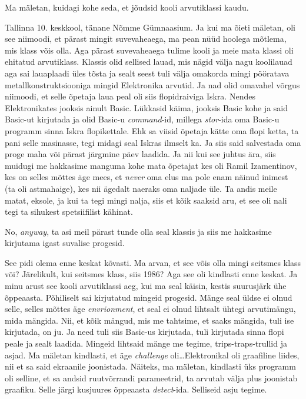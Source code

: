 
                 

Ma mäletan, kuidagi kohe seda, et jõudsid kooli arvutiklassi kaudu.


Tallinna 10. keskkool, tänane Nõmme Gümnaasium. Ja kui ma õieti mäletan, oli see niimoodi, et  pärast mingit suvevaheaega, ma pean nüüd hoolega mõtlema, mis klass võis olla. Aga pärast suvevaheaega tulime kooli ja meie mata klassi oli ehitatud arvutiklass. Klassis olid sellised lauad, mis nägid välja nagu koolilauad aga sai lauaplaadi üles tõsta ja sealt seest tuli välja omakorda mingi  pööratava metallkonstruktsiooniga mingid Elektronika arvutid. Ja nad olid omavahel võrgus niimoodi, et selle õpetaja laua peal oli siis flopidraiviga Iskra. Nendes Elektronikates jooksis ainult Basic. Lükkasid käima, jooksis Basic kohe ja said Basic-ut kirjutada ja olid Basic-u \emph{command}-id, millega \emph{stor}-ida oma Basic-u programm sinna Iskra flopikettale. Ehk sa viisid õpetaja kätte oma flopi ketta, ta pani selle masinasse, tegi midagi seal Iskras ilmselt ka. Ja siis said salvestada oma proge maha või pärast järgmine päev laadida. Ja nii kui see juhtus ära, siis muidugi me hakkasime manguma kohe mata õpetajat kes oli Ramil Izamentinov, kes on selles mõttes äge mees, et \emph{never} oma elus ma pole enam näinud inimest (ta oli astmahaige), kes nii ägedalt naeraks oma naljade üle. Ta andis meile matat, eksole, ja kui ta tegi mingi nalja, siis et kõik saaksid aru, et see oli nali tegi ta sihukest spetsiifilist kähinat. 

No, \emph{anyway}, ta asi meil pärast tunde olla seal klassis ja siis me hakkasime kirjutama igast suvalise progesid. 


See pidi olema enne keskat kõvasti. Ma arvan, et see võis olla mingi seitsmes klass või? Järelikult, kui seitsmes klass, siis 1986? Aga see oli kindlasti enne keskat. Ja minu arust see kooli arvutiklassi aeg, kui ma seal käisin, kestis suurusjärk ühe õppeaasta. Põhiliselt sai kirjutatud mingeid progesid. Mänge seal üldse ei olnud selle, selles mõttes äge \emph{envrionment}, et seal ei olnud lihtsalt ühtegi arvutimängu, mida mängida. Nii, et kõik mängud, mis me tahtsime, et saaks mängida, tuli ise kirjutada, on ju. Ja need tuli siis Basic-us kirjutada, tuli kirjutada sinna flopi peale ja sealt laadida. Mingeid lihtsaid mänge me tegime, trips-traps-trullid ja asjad. Ma mäletan kindlasti, et äge \emph{challenge} oli\ldots Elektronikal  oli graafiline liides, nii et sa said ekraanile joonistada. Näiteks, ma mäletan, kindlasti üks programm oli selline, et sa andsid ruutvõrrandi parameetrid, ta arvutab välja plus joonistab graafiku. Selle järgi kusjuures õppeaasta \emph{detect}-ida. Selliseid asju tegime. 

